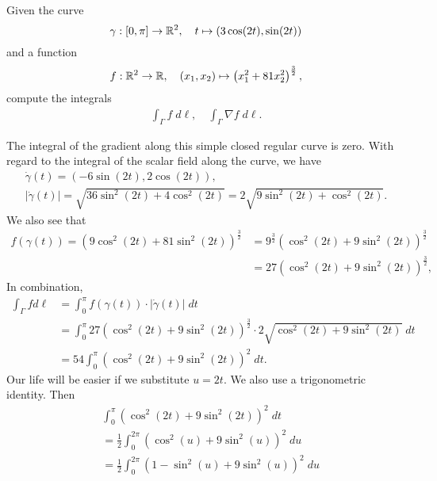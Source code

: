 \documentclass[11pt]{article}
\begin{document}
\begin{exercise}[Challenge?]
    Given the curve
    \[
        \gamma : [0,\pi] \to \mathbb{R}^2, \quad t \mapsto ( 3\cos(2t), \sin(2t) )
    \]
    and a function
    \[
        f : \mathbb{R}^2 \to \mathbb{R}, \quad (x_1,x_2) \mapsto \left( x_1^2 + 81 x_2^2 \right)^{\frac 3 2},
    \]
    compute the integrals 
    \begin{align*}
        \int_\Gamma f \;d\ell, \quad \int_\Gamma \nabla f \;d\ell.
    \end{align*}
\end{exercise}
\begin{solution}     
    The integral of the gradient along this simple closed regular curve is zero.
    With regard to the integral of the scalar field along the curve, we have 
    \begin{gather*}
        \dot\gamma(t) = \left( -6 \sin(2t), 2\cos(2t) \right),
        \\ 
        |\dot\gamma(t)| 
        = 
        \sqrt{ 36 \sin^2(2t) + 4 \cos^2(2t) }
        = 
        2 \sqrt{ 9 \sin^2(2t) + \cos^2(2t) }
        .
    \end{gather*}
    We also see that 
    \begin{align*}
        f(\gamma(t))
        =
        \left( 9\cos^2(2t) + 81 \sin^2(2t) \right)^{\frac 3 2}
        &=
        9^{\frac 3 2 }   \left( \cos^2(2t) + 9 \sin^2(2t) \right)^{\frac 3 2}
        \\&=
        27 \left( \cos^2(2t) + 9 \sin^2(2t) \right)^{\frac 3 2}
        ,
    \end{align*}
    In combination, 
    \begin{align*}
       \int_\Gamma f d\ell
       &=
       \int_0^{\pi} f(\gamma(t)) \cdot |\dot\gamma(t)| \;dt
       \\&=
       \int_0^{\pi} 27 \left( \cos^2(2t) + 9\sin^2(2t) \right)^{\frac 3 2} \cdot 2\sqrt{ \cos^2(2t) + 9\sin^2(2t) } \;dt
       \\&=
       54 \int_0^{\pi} \left( \cos^2(2t) + 9 \sin^2(2t) \right)^{2} \;dt
       .
    \end{align*}
    Our life will be easier if we substitute $u = 2t$. We also use a trigonometric identity. Then
    \begin{align*}
        &
        \int_0^{\pi} \left( \cos^2(2t) + 9 \sin^2(2t) \right)^{2} \;dt
        \\&=
        \frac {1} 2 \int_0^{2\pi} \left( \cos^2(u) + 9 \sin^2(u) \right)^{2} \;du
        \\&=
        \frac {1} 2 \int_0^{2\pi} \left( 1 - \sin^2(u) + 9 \sin^2(u) \right)^{2} \;du

\end{align*}
\end{solution}
\end{document}
